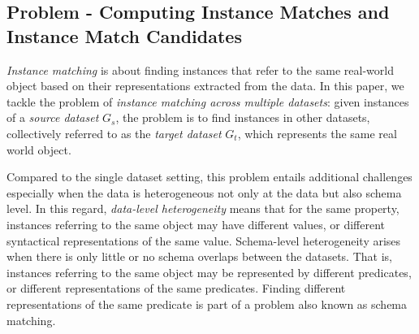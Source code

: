 \subsection{Problem - Computing Instance Matches and Instance Match Candidates} \emph{Instance matching} is about finding instances that refer to the same real-world object based on their representations extracted from the data. In this paper, we tackle the problem of \emph{instance matching across multiple datasets}: given instances of a \emph{source dataset} $G_s$, the problem is to find instances in other datasets, collectively referred to as the \emph{target dataset} $G_t$, which represents the same real world object. 

Compared to the single dataset setting, this problem entails additional challenges especially when the data is heterogeneous not only at the data but also schema level. In this regard, \emph{data-level heterogeneity} means that for the same property, instances referring to the same object may have different values, or different syntactical representations of the same value.  Schema-level heterogeneity arises when there is only little or no schema overlaps between the datasets. That is, instances referring to the same object may be represented by different predicates, or different representations of the same predicates. Finding different representations of the same predicate is part of a problem also known as schema matching. 

